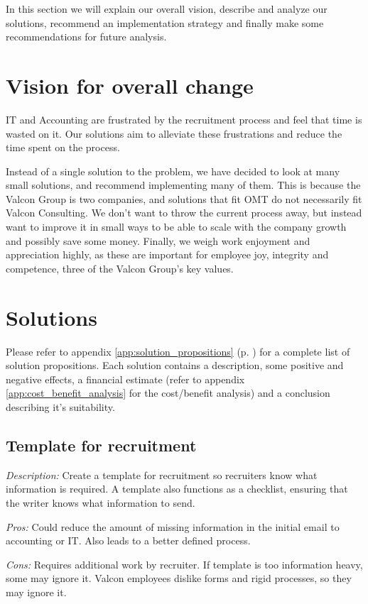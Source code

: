 In this section we will explain our overall vision, describe and analyze our solutions, recommend an implementation strategy and finally make some recommendations for future analysis.

\section{Vision for overall change}
IT and Accounting are frustrated by the recruitment process and feel that time is wasted on it.
Our solutions aim to alleviate these frustrations and reduce the time spent on the process.

Instead of a single solution to the problem, we have decided to look at many small solutions, and recommend implementing many of them.
This is because the Valcon Group is two companies, and solutions that fit OMT do not necessarily fit Valcon Consulting.
We don't want to throw the current process away, but instead want to improve it in small ways to be able to scale with the company growth and possibly save some money.
Finally, we weigh work enjoyment and appreciation highly, as these are important for employee joy, integrity and competence, three of the Valcon Group's key values.

\section{Solutions}
Please refer to appendix \ref{app:solution_propositions} (p. \pageref{app:solution_propositions}) for a complete list of solution propositions.
Each solution contains a description, some positive and negative effects, a financial estimate (refer to appendix \ref{app:cost_benefit_analysis} for the cost/benefit analysis) and a conclusion describing it's suitability.

\subsection{Template for recruitment}
\emph{Description:} Create a template for recruitment so recruiters know what information is required. A template also functions as a checklist, ensuring that the writer knows what information to send.

\emph{Pros:} Could reduce the amount of missing information in the initial email to accounting or IT. 
Also leads to a better defined process.

\emph{Cons:} Requires additional work by recruiter. 
If template is too information heavy, some may ignore it.
Valcon employees dislike forms and rigid processes, so they may ignore it.

